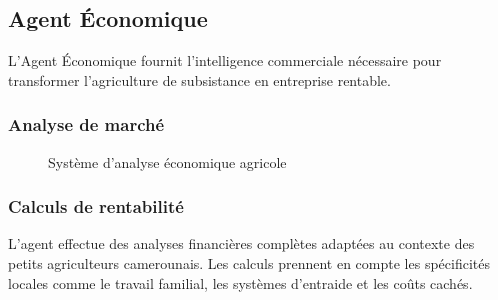 \subsection{Agent Économique}

L'Agent Économique fournit l'intelligence commerciale nécessaire pour transformer l'agriculture de subsistance en entreprise rentable.

\subsubsection{Analyse de marché}

\begin{figure}[H]
\centering
{}
\caption{Système d'analyse économique agricole}
\end{figure}

\subsubsection{Calculs de rentabilité}

L'agent effectue des analyses financières complètes adaptées au contexte des petits agriculteurs camerounais. Les calculs prennent en compte les spécificités locales comme le travail familial, les systèmes d'entraide et les coûts cachés.

